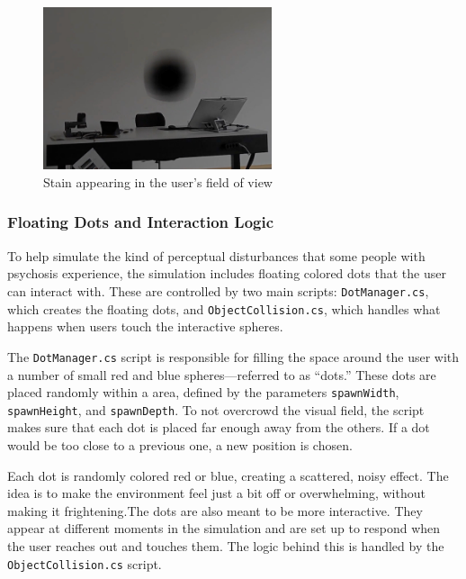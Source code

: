\begin{figure}[h!] 
    \centering 
    \includegraphics[width=0.6\textwidth]{../../Figures/stain-video.jpg} 
    \caption{Stain appearing in the user's field of view} 
    \label{fig:stain} 
\end{figure}

\subsubsection{Floating Dots and Interaction Logic}

To help simulate the kind of perceptual disturbances that some people with psychosis experience, the simulation includes floating colored dots that the user can interact with. These are controlled by two main scripts: \texttt{DotManager.cs}, which creates the floating dots, and \texttt{ObjectCollision.cs}, which handles what happens when users touch the interactive spheres.

\vspace{1em}

The \texttt{DotManager.cs} script is responsible for filling the space around the user with a number of small red and blue spheres—referred to as “dots.” These dots are placed randomly within a area, defined by the parameters \texttt{spawnWidth}, \texttt{spawnHeight}, and \texttt{spawnDepth}. To not overcrowd the visual field, the script makes sure that each dot is placed far enough away from the others. If a dot would be too close to a previous one, a new position is chosen.

Each dot is randomly colored red or blue, creating a scattered, noisy effect. The idea is to make the environment feel just a bit off or overwhelming, without making it frightening.The dots are also meant to be more interactive. They appear at different moments in the simulation and are set up to respond when the user reaches out and touches them. The logic behind this is handled by the \texttt{ObjectCollision.cs} script.

